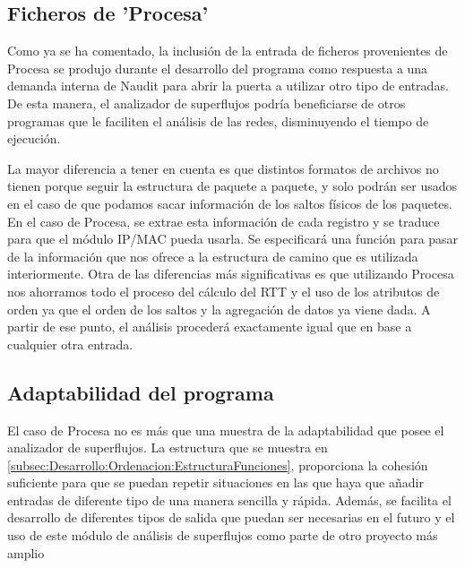 \documentclass[twoside, 12pt]{epstfg}
\begin{document}
\subsection{Ficheros de 'Procesa'}
Como ya se ha comentado, la inclusión de la entrada de ficheros provenientes de Procesa se produjo durante el desarrollo del programa como respuesta a una demanda interna de Naudit para abrir la puerta a utilizar otro tipo de entradas. De esta manera, el analizador de superflujos podría beneficiarse de otros programas que le faciliten el análisis de las redes, disminuyendo el tiempo de ejecución. 

La mayor diferencia a tener en cuenta es que distintos formatos de archivos no tienen porque seguir la estructura de paquete a paquete, y solo podrán ser usados en el caso de que podamos sacar información de los saltos físicos de los paquetes. En el caso de Procesa, se extrae esta información de cada registro y se traduce para que el módulo IP/MAC pueda usarla. Se especificará una función para pasar de la información que nos ofrece a la estructura de camino que es utilizada interiormente. Otra de las diferencias más significativas es que utilizando Procesa nos ahorramos todo el proceso del cálculo del RTT y el uso de los atributos de orden ya que el orden de los saltos y la agregación de datos ya viene dada. A partir de ese punto, el análisis procederá exactamente igual que en base a cualquier otra entrada.

\subsection{Adaptabilidad del programa}
El caso de Procesa no es más que una muestra de la adaptabilidad que posee el analizador de superflujos. La estructura que se muestra en \ref{subsec:Desarrollo:Ordenacion:EstructuraFunciones}, proporciona la cohesión suficiente para que se puedan repetir situaciones en las que haya que añadir entradas de diferente tipo de una manera sencilla y rápida. Además, se facilita el desarrollo de diferentes tipos de salida que puedan ser necesarias en el futuro y el uso de este módulo de análisis de superflujos como parte de otro proyecto más amplio
\end{document}
